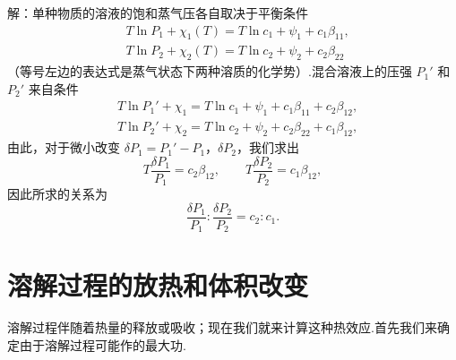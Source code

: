 \begin{xiti}
解：单种物质的溶液的饱和蒸气压各自取决于平衡条件
\begin{equation*}
\begin{aligned}
  &T\ln P_1+\chi_1(T)=T\ln c_1+\psi_1+c_1\beta_{11},\\
  &T\ln P_2+\chi_2(T)=T\ln c_2+\psi_2+c_2\beta_{22}
\end{aligned}
\end{equation*}
（等号左边的表达式是蒸气状态下两种溶质的化学势）.混合溶液上的压强 $P_1'$ 和 $P_2'$ 来自条件
\begin{equation*}
\begin{aligned}
  &T\ln P_1'+\chi_1=T\ln c_1+\psi_1+c_1\beta_{11}+c_2\beta_{12},\\
  &T\ln P_2'+\chi_2=T\ln c_2+\psi_2+c_2\beta_{22}+c_1\beta_{12},
\end{aligned}
\end{equation*}
由此，对于微小改变 $\delta P_1=P_1'-P_1$，$\delta P_2$，我们求出
\begin{equation*}
  T\frac{\delta P_1}{P_1}=c_2\beta_{12},\qquad
  T\frac{\delta P_2}{P_2}=c_1\beta_{12},
\end{equation*}
因此所求的关系为
\begin{equation*}
  \frac{\delta P_1}{P_1}:\frac{\delta P_2}{P_2}=c_2:c_1.
\end{equation*}

\end{xiti}

\section{溶解过程的放热和体积改变}

溶解过程伴随着热量的释放或吸收；现在我们就来计算这种热效应.首先我们来确定由于溶解过程可能作的最大功.


